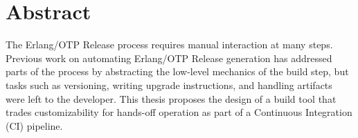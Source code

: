 \cleardoublepage{}

\chapter*{Abstract}

The Erlang/OTP Release process requires manual interaction at many steps. Previous work on automating Erlang/OTP Release generation has addressed parts of the process by abstracting the low-level mechanics of the build step, but tasks such as versioning, writing upgrade instructions, and handling artifacts were left to the developer. This thesis proposes  the design of a build tool that trades customizability for hands-off operation as part of a Continuous Integration (CI) pipeline.
